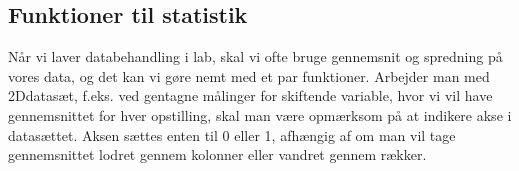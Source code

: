 \documentclass[letterpaper,10pt,english]{jupyterBook}
\begin{document}
\begin{sphinxVerbatim}[commandchars=\\\{\}]
[0 1 2 3 4 5 6 7 8 9]
[ 1  2  5 10 17 26 37 50 65 82]
[1.00000000e+00 2.71828183e+00 7.38905610e+00 2.00855369e+01
 5.45981500e+01 1.48413159e+02 4.03428793e+02 1.09663316e+03
 2.98095799e+03 8.10308393e+03]
\end{sphinxVerbatim}


\subsection{Funktioner til statistik}
\label{\detokenize{notebooks/MekRel/Numpy:funktioner-til-statistik}}
Når vi laver databehandling i lab, skal vi ofte bruge gennemsnit og spredning på vores data, og det kan vi gøre nemt med et par \sphinxhyphen{}funktioner. Arbejder man med 2D\sphinxhyphen{}datasæt, f.eks. ved gentagne målinger for skiftende variable, hvor vi vil have gennemsnittet for hver opstilling, skal man være opmærksom på at indikere akse i datasættet. Aksen sættes enten til 0 eller 1, afhængig af om man vil tage gennemsnittet lodret gennem kolonner eller vandret gennem rækker.
\end{document}
